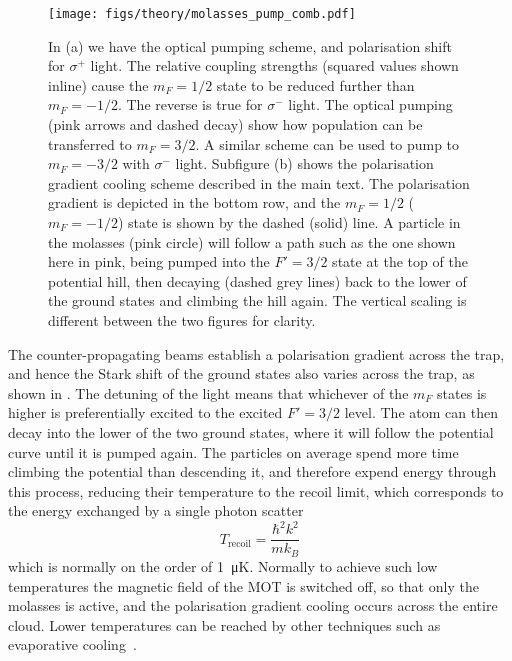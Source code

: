 \begin{figure}[htb]
  \centering
  \texttt{[image: figs/theory/molasses\_pump\_comb.pdf]}
    \caption[Subdoppler cooling]{
      In (a) we have the optical pumping scheme, and polarisation shift
      for $\sigma^+$ light. The relative coupling strengths (squared values
      shown inline) cause the $m_F=1/2$ state to be reduced further than
      $m_F=-1/2$.  The reverse is true for $\sigma^-$ light. The optical
      pumping (pink arrows and dashed decay) show how population can be
      transferred to $m_F=3/2$. A similar scheme can be used to pump to
      $m_F=-3/2$ with $\sigma^-$ light. Subfigure (b) shows the polarisation
      gradient cooling scheme described in the main text.  The polarisation
      gradient is depicted in the bottom row, and the $m_F=1/2$ ($m_F=-1/2$)
      state is shown by the dashed (solid) line. A particle in the molasses
      (pink circle) will follow a path such as the one shown here in pink,
      being pumped into the $F'=3/2$ state at the top of the potential hill,
      then decaying (dashed grey lines) back to the lower of the ground states
      and climbing the hill again. The vertical scaling is different between
      the two figures for clarity.
  }
  \label{theory:fig:subdoppler}
\end{figure}

The counter-propagating beams establish a polarisation gradient across the
trap, and hence the Stark shift of the ground states also varies across the
trap, as shown in . The detuning of the
light means that whichever of the $m_F$ states is higher is preferentially
excited to the excited $F'=3/2$ level.
%
The atom can then decay into the lower of the two ground states, where it
will follow the potential curve until it is pumped again. The particles on
average spend more time climbing the potential than descending it, and
therefore expend energy through this process, reducing their temperature to the
recoil limit, which corresponds to the energy exchanged by a single photon
scatter
%
\begin{equation}
  T_\text{recoil} = \frac{\hbar^2 k^2}{m k_B}
\end{equation}
%
which is normally on the order of \SI{1}{\micro\kelvin}.  Normally to achieve
such low temperatures the magnetic field of the MOT is switched off, so that
only the molasses is active, and the polarisation gradient cooling occurs
across the entire cloud. Lower temperatures can be reached by other techniques
such as evaporative cooling~\cite{Metcalf1999}.


